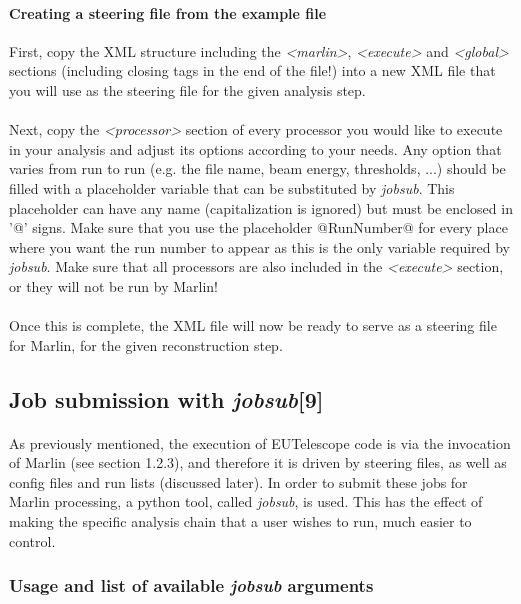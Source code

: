 \documentclass[11pt]{article}
\begin{document}
\paragraph{Creating a steering file from the example file}
First, copy the XML structure including the \textit{\textless marlin\textgreater}, \textit{\textless execute\textgreater} and \textit{\textless global\textgreater} sections (including closing tags in the end of the file!) into a new XML file that you will use as the steering file for the given analysis step.
\paragraph{}
Next, copy the \textit{\textless processor\textgreater} section of every processor you would like to execute in your analysis and adjust its options according to your needs. Any option that varies from run to run (e.g. the file name, beam energy, thresholds, ...) should be filled with a placeholder variable that can be substituted by \textit{jobsub}. This placeholder can have any name (capitalization is ignored) but must be enclosed in '@' signs. Make sure that you use the placeholder @RunNumber@ for every place where you want the run number to appear as this is the only variable required by \textit{jobsub}. Make sure that all processors are also included in the \textit{\textless execute\textgreater} section, or they will not be run by Marlin!
\paragraph{}
Once this is complete, the XML file will now be ready to serve as a steering file for Marlin, for the given reconstruction step.
\subsection{Job submission with \textit{jobsub}[9]}
\paragraph{}
As previously mentioned, the execution of EUTelescope code is via the invocation of Marlin (see section 1.2.3), and therefore it is driven by steering files, as well as config files and run lists (discussed later). In order to submit these jobs for Marlin processing, a python tool, called \textit{jobsub}, is used. This has the effect of making the specific analysis chain that a user wishes to run, much easier to control.
\subsubsection{Usage and list of available \textit{jobsub} arguments}
\end{document}

